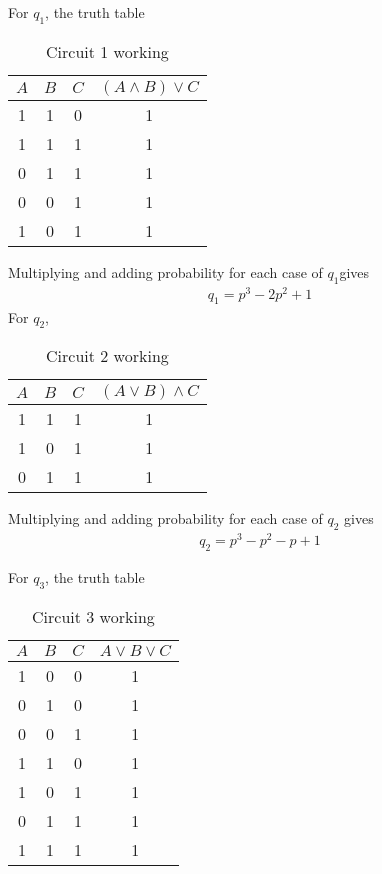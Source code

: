\documentclass[journal,12pt,twocolumn]{IEEEtran}
\begin{document}
For $q_1$, the truth table\\

\begin{table}[h]
    \centering
    \begin{tabular}{|c|c|c|c|}
    \hline
         $A$ & $B$ & $C$ & $(A \land B) \lor C$ \\
         \hline
         1 &1  & 0 &1\\\hline
         1&1&1&1\\\hline
         0&1&1&1\\\hline
         0&0&1&1\\\hline
         1&0&1&1\\
    \hline
    \end{tabular}
    \caption{Circuit 1 working}
    \label{tab:my_label}
\end{table}

Multiplying and adding probability for each case of $q_1$gives
\begin{align}
    q_1 = p^3-2p^2+1
\end{align}
For $q_2$,
\begin{table}[h]
    \centering
    \begin{tabular}{|c|c|c|c|}
    \hline
         $A$ & $B$ & $C$ & $(A \lor B) \land C$ \\
         \hline
         1&1&1&1\\ \hline
         1&0&1&1\\\hline
         0&1&1&1\\
    \hline
    \end{tabular}
    \caption{Circuit 2 working}
    \label{tab:table2}
\end{table}

Multiplying and adding probability for each case of $q_2$ gives
\begin{align}
    q_2 = p^3-p^2-p+1
\end{align}

For $q_3$, the truth table
\begin{table}[h]
    \centering
    \begin{tabular}{|c|c|c|c|}
    \hline
         $A$ & $B$ & $C$ & $A \lor B \lor C$ \\
         \hline
         1&0&0&1\\\hline
         0&1&0&1\\\hline
         0&0&1&1\\\hline
         1&1&0&1\\\hline
         1&0&1&1\\\hline
         0&1&1&1\\\hline
         1&1&1&1\\
    \hline
    \end{tabular}
    \caption{Circuit 3 working}
    \label{tab:table3}
\end{table}
\end{document}
